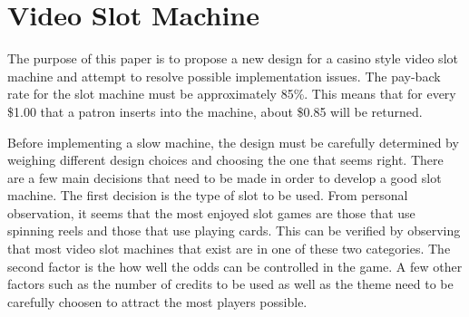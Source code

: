 
\section{Video Slot Machine}

The purpose of this paper is to propose a new design for a casino style video slot machine and
attempt to resolve possible implementation issues.  The pay-back rate for the slot machine must
be approximately 85\%.  This means that for every \$1.00 that a patron inserts into the machine,
about \$0.85 will be returned.



  Before implementing a slow machine, the design must be carefully determined by weighing different design choices and choosing the one that seems right.  There are a few main decisions that need to be made in order to develop a good slot machine.  The first decision is the type of slot to be used. From personal observation, it seems that the most enjoyed slot games are those that use spinning reels and those that use playing cards. This can be verified by observing that most video slot machines that exist are in one of these two categories. The second factor is the how well the odds can be controlled in the game.  A few other factors such as the number of credits to be used as well as the theme need to be carefully choosen to attract the most players possible.
  
